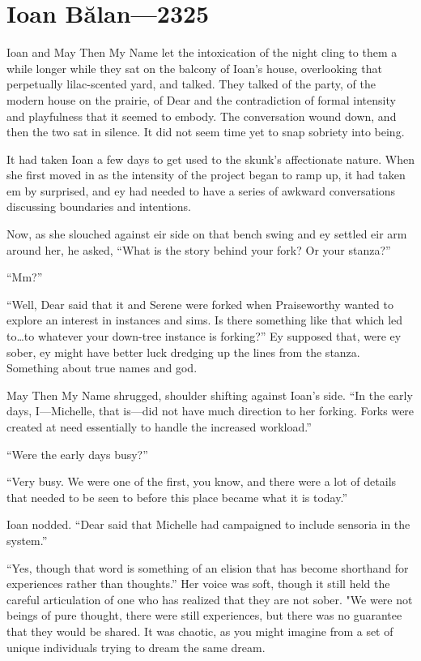\hypertarget{ioan-bux103lan-2325}{%
\chapter{Ioan Bălan—2325}\label{ioan-bux103lan-2325}}

Ioan and May Then My Name let the intoxication of the night cling to them a while longer while they sat on the balcony of Ioan's house, overlooking that perpetually lilac-scented yard, and talked. They talked of the party, of the modern house on the prairie, of Dear and the contradiction of formal intensity and playfulness that it seemed to embody. The conversation wound down, and then the two sat in silence. It did not seem time yet to snap sobriety into being.

It had taken Ioan a few days to get used to the skunk's affectionate nature. When she first moved in as the intensity of the project began to ramp up, it had taken em by surprised, and ey had needed to have a series of awkward conversations discussing boundaries and intentions.

Now, as she slouched against eir side on that bench swing and ey settled eir arm around her, he asked, ``What is the story behind your fork? Or your stanza?''

``Mm?''

``Well, Dear said that it and Serene were forked when Praiseworthy wanted to explore an interest in instances and sims. Is there something like that which led to\ldots to whatever your down-tree instance is forking?'' Ey supposed that, were ey sober, ey might have better luck dredging up the lines from the stanza. Something about true names and god.

May Then My Name shrugged, shoulder shifting against Ioan's side. ``In the early days, I---Michelle, that is---did not have much direction to her forking. Forks were created at need essentially to handle the increased workload.''

``Were the early days busy?''

``Very busy. We were one of the first, you know, and there were a lot of details that needed to be seen to before this place became what it is today.''

Ioan nodded. ``Dear said that Michelle had campaigned to include sensoria in the system.''

``Yes, though that word is something of an elision that has become shorthand for experiences rather than thoughts.'' Her voice was soft, though it still held the careful articulation of one who has realized that they are not sober. "We were not beings of pure thought, there were still experiences, but there was no guarantee that they would be shared. It was chaotic, as you might imagine from a set of unique individuals trying to dream the same dream.

